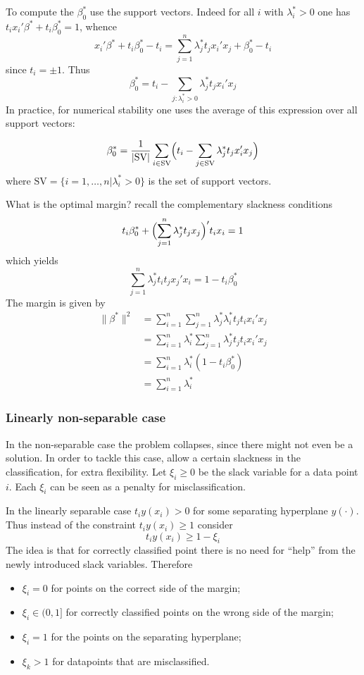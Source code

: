 \documentclass[a4paper]{article}
\begin{document}
To compute the $\beta^*_0$ use the support vectors. Indeed for all $i$ with
$\lambda^*_i>0$ one has $t_i x_i'\beta^* + t_i\beta^*_0 = 1$, whence
\[ 
x_i'\beta^* + t_i\beta^*_0 - t_i 
= \sum_{j=1}^n \lambda^*_j t_j x_i'x_j + \beta^*_0 - t_i
\]
since $t_i = \pm 1$. Thus 
\[
\beta^*_0 = t_i - \sum_{j:\lambda^*_i>0} \lambda^*_j t_j x_i'x_j
\]
In practice, for numerical stability one uses the average of this expression
over all support vectors:

\[
\beta^*_0
= \frac{1}{|\text{SV}|}\sum_{i\in \text{SV}}\Bigl(
	t_i - \sum_{j\in \text{SV}} \lambda^*_j t_j x_i'x_j
\Bigr)
\]
where $\text{SV} = \{i=1,\ldots,n| \lambda^*_i>0\}$ is the set of support vectors.

What is the optimal margin? recall the complementary slackness conditions
\[
t_i \beta^*_0 + \Bigl(\sum_{j=1}^n \lambda^*_j t_jx_j\Bigr)' t_i x_i =1
\]
which yields
\[
\sum_{j=1}^n \lambda^*_j t_i t_j x_j'x_i = 1 - t_i\beta^*_0
\]
The margin is given by
\begin{align*}
	\|\beta^*\|^2
	&= \sum_{i=1}^n \sum_{j=1}^n \lambda_j^* \lambda_i^* t_j t_i x_i'x_j \\
	&= \sum_{i=1}^n \lambda_i^* \sum_{j=1}^n \lambda_j^* t_j t_i x_i'x_j \\
	&= \sum_{i=1}^n \lambda_i^* ( 1 - t_i\beta^*_0 ) \\
	&= \sum_{i=1}^n \lambda_i^*
\end{align*}


\subsubsection{Linearly non-separable case} %
\label{ssub:linearly_non_separable_case}

In the non-separable case the problem collapses, since there might not even be
a solution. In order to tackle this case, allow a certain slackness in the classification,
for extra flexibility. Let $\xi_i\geq0$ be the slack variable for a data point $i$.
Each $\xi_i$ can be seen as a penalty for misclassification.

In the linearly separable case $t_i y(x_i) > 0$ for some separating hyperplane $y(\cdot)$.
Thus instead of the constraint $t_i y(x_i)\geq 1$ consider
\[ t_i y(x_i)\geq 1-\xi_i \]
The idea is that for correctly classified point there is no need for ``help'' from
the newly introduced slack variables. Therefore \begin{itemize}
	\item $\xi_i = 0$ for points on the correct side of the margin;
	\item $\xi_i\in(0,1]$ for correctly classified points on the wrong side of the margin;
	\item $\xi_i = 1$ for the points on the separating hyperplane;
	\item $\xi_k > 1$ for datapoints that are misclassified.
\end{itemize}
\end{document}
